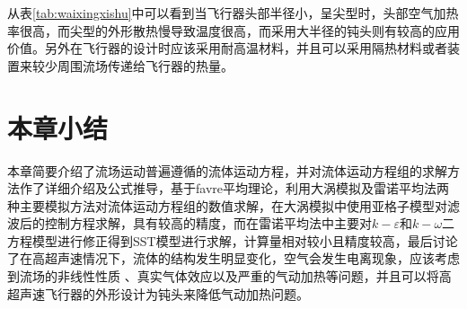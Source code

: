 从表\ref{tab:waixingxishu}中可以看到当飞行器头部半径小，呈尖型时，头部空气加热率很高，而尖型的外形散热慢导致温度很高，而采用大半径的钝头则有较高的应用价值。另外在飞行器的设计时应该采用耐高温材料，并且可以采用隔热材料或者装置来较少周围流场传递给飞行器的热量。
\section{本章小结}
本章简要介绍了流场运动普遍遵循的流体运动方程，并对流体运动方程组的求解方法作了详细介绍及公式推导，基于favre平均理论，利用大涡模拟及雷诺平均法两种主要模拟方法对流体运动方程组的数值求解，在大涡模拟中使用亚格子模型对滤波后的控制方程求解，具有较高的精度，而在雷诺平均法中主要对$k-\varepsilon$和$k-\omega$二方程模型进行修正得到SST模型进行求解，计算量相对较小且精度较高，最后讨论了在高超声速情况下，流体的结构发生明显变化，空气会发生电离现象，应该考虑到流场的非线性性质 、真实气体效应以及严重的气动加热等问题，并且可以将高超声速飞行器的外形设计为钝头来降低气动加热问题。
